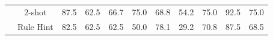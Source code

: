 {\begin{tabular}{lcccccccccc}
 & \cellcolor{darkpurple!25}2-shot & \cellcolor{lightpurple!25}87.5 & \cellcolor{lightpurple!25}62.5 & \cellcolor{lightpurple!25}66.7 & \cellcolor{lightpurple!25}75.0 & \cellcolor{lightpurple!25}68.8 & \cellcolor{lightpurple!25}54.2 & \cellcolor{lightpurple!25}75.0 & \cellcolor{lightpurple!25}92.5 & \cellcolor{darkpurple!25}75.0 \\
 & \cellcolor{darkpurple!25}Rule Hint & \cellcolor{lightpurple!25}82.5 & \cellcolor{lightpurple!25}62.5 & \cellcolor{lightpurple!25}62.5 & \cellcolor{lightpurple!25}50.0 & \cellcolor{lightpurple!25}78.1 & \cellcolor{lightpurple!25}29.2 & \cellcolor{lightpurple!25}70.8 & \cellcolor{lightpurple!25}87.5 & \cellcolor{darkpurple!25}68.5 \\
\bottomrule
\end{tabular}}


% 
